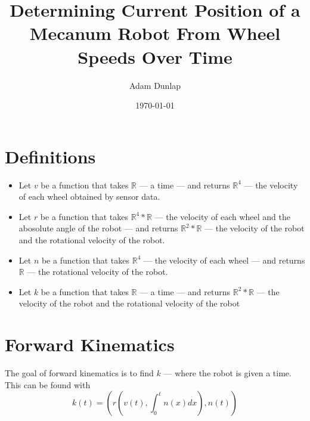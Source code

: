 \documentclass{article}
\begin{document}
\title{Determining Current Position of a Mecanum Robot From Wheel Speeds Over Time}
\author{Adam Dunlap}
\date{\today}
\maketitle

\section{Definitions}
\begin{itemize}
\item Let $v$ be a function that takes $\mathbb{R}$ --- a time --- and returns $\mathbb{R}^4$ --- the velocity of each wheel obtained by sensor data.

\item Let $r$ be a function that takes $\mathbb{R}^4 * \mathbb{R}$ --- the velocity of each wheel and the abosolute angle of the robot --- and returns $\mathbb{R}^2 * \mathbb{R}$ --- the velocity of the robot and the rotational velocity of the robot.

\item Let $n$ be a function that takes $\mathbb{R}^4$ --- the velocity of each wheel --- and returns $\mathbb{R}$ --- the rotational velocity of the robot.

\item Let $k$ be a function that takes $\mathbb{R}$ --- a time --- and returns $\mathbb{R}^2 * \mathbb{R}$ --- the velocity of the robot and the rotational velocity of the robot

\end{itemize}

\section{Forward Kinematics}
The goal of forward kinematics is to find $k$ --- where the robot is given a time. This can be found with
\[
k(t) = \left(r\left(v\left(t\right), \int_0^t n\left(x\right) dx\right), n\left(t\right)\right)
\]
\end{document}
